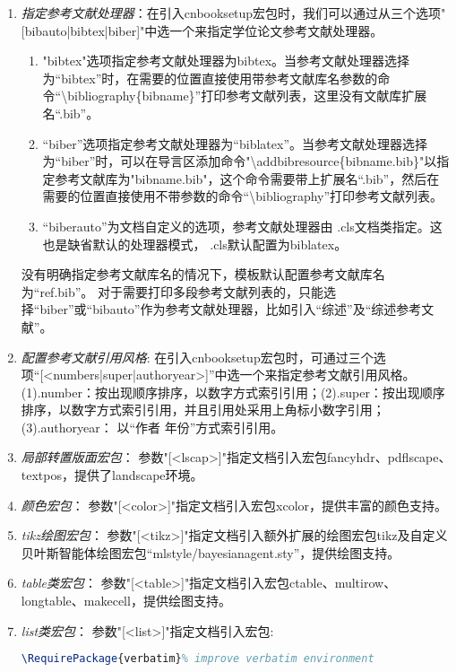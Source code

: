 \begin{enumerate}
    \item \emph{指定参考文献处理器}：在引入cnbooksetup宏包时，我们可以通过从三个选项"[bibauto|bibtex|biber]"中选一个来指定学位论文参考文献处理器。
        \begin{enumerate}
            \footnotesize
            \item "bibtex"选项指定参考文献处理器为bibtex。当参考文献处理器选择为“bibtex”时，在需要的位置直接使用带参考文献库名参数的命令“\backslash \projectname bibliography\{bibname\}”打印参考文献列表，这里没有文献库扩展名“.bib”。
            \item “biber”选项指定参考文献处理器为“biblatex”。当参考文献处理器选择为“biber”时，可以在导言区添加命令"\backslash addbibresource\{bibname.bib\}"以指定参考文献库为"bibname.bib"，这个命令需要带上扩展名“.bib”，然后在需要的位置直接使用不带参数的命令“\backslash \projectname bibliography”打印参考文献列表。
            \item “biberauto”为文档自定义的选项，参考文献处理器由 \projectname.cls文档类指定。这也是缺省默认的处理器模式， \projectname.cls默认配置为biblatex。
        \end{enumerate}
    没有明确指定参考文献库名的情况下，模板默认配置参考文献库名为“ref.bib”。
    对于需要打印多段参考文献列表的，只能选择“biber”或“bibauto”作为参考文献处理器，比如引入“综述”及“综述参考文献”。
    \item \emph{配置参考文献引用风格}: 在引入cnbooksetup宏包时，可通过三个选项“[<numbers|super|authoryear>]”中选一个来指定参考文献引用风格。(1).number：按出现顺序排序，以数字方式索引引用；(2).super：按出现顺序排序，以数字方式索引引用，并且引用处采用上角标小数字引用；(3).authoryear： 以“作者 年份”方式索引引用。
    \item \emph{局部转置版面宏包}： 参数"[<lscap>]"指定文档引入宏包fancyhdr、pdflscape、textpos，提供了landscape环境。
    \item \emph{颜色宏包}： 参数"[<color>]"指定文档引入宏包xcolor，提供丰富的颜色支持。
    \item \emph{tikz绘图宏包}： 参数"[<tikz>]"指定文档引入额外扩展的绘图宏包tikz及自定义贝叶斯智能体绘图宏包“mlstyle/bayesianagent.sty”，提供绘图支持。
    \item \emph{table类宏包}： 参数"[<table>]"指定文档引入宏包ctable、multirow、longtable、makecell，提供绘图支持。
    \item \emph{list类宏包}： 参数"[<list>]"指定文档引入宏包:
        \begin{lstlisting}[language=tex]
            \RequirePackage{verbatim}% improve verbatim environment

\end{lstlisting}
\end{enumerate}
